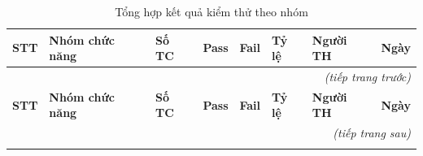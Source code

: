 \renewcommand{\arraystretch}{1.1}
\setlength{\tbu}{\dimexpr(\linewidth - 16\tabcolsep - 9\arrayrulewidth - 4pt)/100\relax}
{\small
\begin{longtable}{|p{4\tbu}|p{28\tbu}|p{8\tbu}|p{8\tbu}|p{8\tbu}|p{10\tbu}|p{16\tbu}|p{18\tbu}|}
    \caption{Tổng hợp kết quả kiểm thử theo nhóm}
    \label{tab:testcase_result} \\
    \hline
    \textbf{STT} & \textbf{Nhóm chức năng} & \textbf{Số TC} & \textbf{Pass} & \textbf{Fail} & \textbf{Tỷ lệ} & \textbf{Người TH} & \textbf{Ngày} \\ \hline
    \endfirsthead
    \multicolumn{8}{r}{\textit{(tiếp trang trước)}} \\
    \hline
    \textbf{STT} & \textbf{Nhóm chức năng} & \textbf{Số TC} & \textbf{Pass} & \textbf{Fail} & \textbf{Tỷ lệ} & \textbf{Người TH} & \textbf{Ngày} \\ \hline
    \endhead
    \hline \multicolumn{8}{r}{\textit{(tiếp trang sau)}} \\
    \endfoot
    \hline
    \endlastfoot


\end{longtable}}
